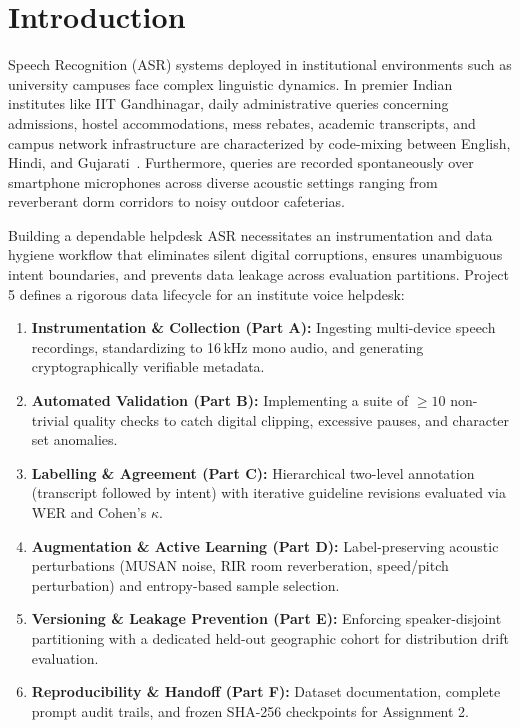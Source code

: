 \documentclass[10pt,journal,compsoc]{IEEEtran}
\begin{document}
\maketitle
\IEEEdisplaynontitleabstractindextext
\IEEEpeerreviewmaketitle

\section{Introduction}
 Speech Recognition (ASR) systems deployed in institutional environments such as university campuses face complex linguistic dynamics. In premier Indian institutes like IIT Gandhinagar, daily administrative queries concerning admissions, hostel accommodations, mess rebates, academic transcripts, and campus network infrastructure are characterized by code-mixing between English, Hindi, and Gujarati~\cite{sitaram2019survey}. Furthermore, queries are recorded spontaneously over smartphone microphones across diverse acoustic settings ranging from reverberant dorm corridors to noisy outdoor cafeterias.

Building a dependable helpdesk ASR necessitates an instrumentation and data hygiene workflow that eliminates silent digital corruptions, ensures unambiguous intent boundaries, and prevents data leakage across evaluation partitions. Project 5 defines a rigorous data lifecycle for an institute voice helpdesk:
\begin{enumerate}
    \item \textbf{Instrumentation \& Collection (Part A):} Ingesting multi-device speech recordings, standardizing to 16\,kHz mono audio, and generating cryptographically verifiable metadata.
    \item \textbf{Automated Validation (Part B):} Implementing a suite of $\ge 10$ non-trivial quality checks to catch digital clipping, excessive pauses, and character set anomalies.
    \item \textbf{Labelling \& Agreement (Part C):} Hierarchical two-level annotation (transcript followed by intent) with iterative guideline revisions evaluated via WER and Cohen's $\kappa$.
    \item \textbf{Augmentation \& Active Learning (Part D):} Label-preserving acoustic perturbations (MUSAN noise, RIR room reverberation, speed/pitch perturbation) and entropy-based sample selection.
    \item \textbf{Versioning \& Leakage Prevention (Part E):} Enforcing speaker-disjoint partitioning with a dedicated held-out geographic cohort for distribution drift evaluation.
    \item \textbf{Reproducibility \& Handoff (Part F):} Dataset documentation, complete prompt audit trails, and frozen SHA-256 checkpoints for Assignment 2.
\end{enumerate}
\end{document}

